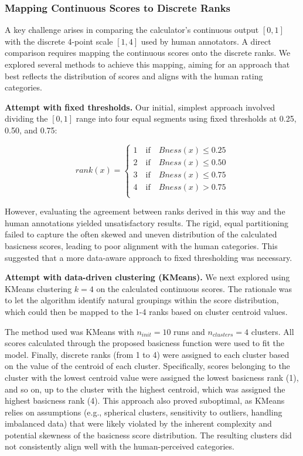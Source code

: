\documentclass[preprint,12pt,authoryear]{elsarticle}
\begin{document}
\subsubsection{Mapping Continuous Scores to Discrete Ranks}

A key challenge arises in comparing the calculator's continuous output $[0,1]$ with the discrete 4-point scale $[1,4]$ used by human annotators. A direct comparison requires mapping the continuous scores onto the discrete ranks. We explored several methods to achieve this mapping, aiming for an approach that best reflects the distribution of scores and aligns with the human rating categories.

\textbf{Attempt with fixed thresholds.} Our initial, simplest approach involved dividing the $[0,1]$ range into four equal segments using fixed thresholds at 0.25, 0.50, and 0.75:

$$ 
rank(x) = 
\begin{cases}
	1 \quad \text{if} \quad Bness(x) \leq 0.25 \\
	2 \quad \text{if} \quad Bness(x) \leq 0.50 \\
	3 \quad \text{if} \quad Bness(x) \leq 0.75 \\
	4 \quad \text{if} \quad Bness(x) > 0.75    \\
\end{cases}
$$

However, evaluating the agreement between ranks derived in this way and the human annotations yielded unsatisfactory results. The rigid, equal partitioning failed to capture the often skewed and uneven distribution of the calculated basicness scores, leading to poor alignment with the human categories. This suggested that a more data-aware approach to fixed thresholding was necessary.

\textbf{Attempt with data-driven clustering (KMeans).} We next explored using KMeans clustering $k=4$ on the calculated continuous scores. The rationale was to let the algorithm identify natural groupings within the score distribution, which could then be mapped to the 1-4 ranks based on cluster centroid values. 

The method used was KMeans with $n_{init}=10$ runs and $n_{clusters}=4$ clusters. All scores calculated through the proposed basicness function were used to fit the model. Finally, discrete ranks (from 1 to 4) were assigned to each cluster based on the value of the centroid of each cluster. Specifically, scores belonging to the cluster with the lowest centroid value were assigned the lowest basicness rank (1), and so on, up to the cluster with the highest centroid, which was assigned the highest basicness rank (4). This approach also proved suboptimal, as KMeans relies on assumptions (e.g., spherical clusters, sensitivity to outliers, handling imbalanced data) that were likely violated by the inherent complexity and potential skewness of the basicness score distribution. The resulting clusters did not consistently align well with the human-perceived categories.
\end{document}
